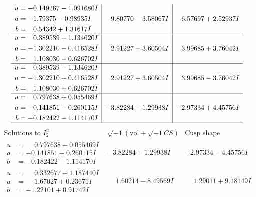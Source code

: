 \documentclass[1p]{elsarticle_modified}
\theoremstyle{definition}
\newcommand{\I}{\sqrt{-1}}
\begin{document}
$$\begin{array}{c|c|c}
\begin{aligned}
u &= -0.149267 - 1.091680 I \\
a &= -1.79375 - 0.98935 I \\
b &= \phantom{-}0.54342 + 1.31617 I\end{aligned}
 & \phantom{-}9.80770 - 3.58067 I & \phantom{-}6.57697 + 2.52937 I \\ \hline\begin{aligned}
u &= \phantom{-}0.389539 + 1.134620 I \\
a &= -1.302210 - 0.416528 I \\
b &= \phantom{-}1.108030 - 0.626702 I\end{aligned}
 & \phantom{-}2.91227 - 3.60504 I & \phantom{-}3.99685 + 3.76042 I \\ \hline\begin{aligned}
u &= \phantom{-}0.389539 - 1.134620 I \\
a &= -1.302210 + 0.416528 I \\
b &= \phantom{-}1.108030 + 0.626702 I\end{aligned}
 & \phantom{-}2.91227 + 3.60504 I & \phantom{-}3.99685 - 3.76042 I \\ \hline\begin{aligned}
u &= \phantom{-}0.797638 + 0.055469 I \\
a &= -0.141851 - 0.260115 I \\
b &= -0.182422 - 1.114170 I\end{aligned}
 & -3.82284 - 1.29938 I & -2.97334 + 4.45756 I\\
 \hline 
 \end{array}$$\newpage$$\begin{array}{c|c|c}  
\text{Solutions to }I^u_{2}& \I (\text{vol} + \sqrt{-1}CS) & \text{Cusp shape}\\
 \hline 
\begin{aligned}
u &= \phantom{-}0.797638 - 0.055469 I \\
a &= -0.141851 + 0.260115 I \\
b &= -0.182422 + 1.114170 I\end{aligned}
 & -3.82284 + 1.29938 I & -2.97334 - 4.45756 I \\ \hline\begin{aligned}
u &= \phantom{-}0.332677 + 1.187440 I \\
a &= \phantom{-}1.67027 + 0.23671 I \\
b &= -1.22101 + 0.91742 I\end{aligned}
 & \phantom{-}1.60214 - 8.49569 I & \phantom{-}1.29011 + 9.18149 I \\ \hline\begin{aligned}

\end{aligned}
\end{array}$$
\end{document}
